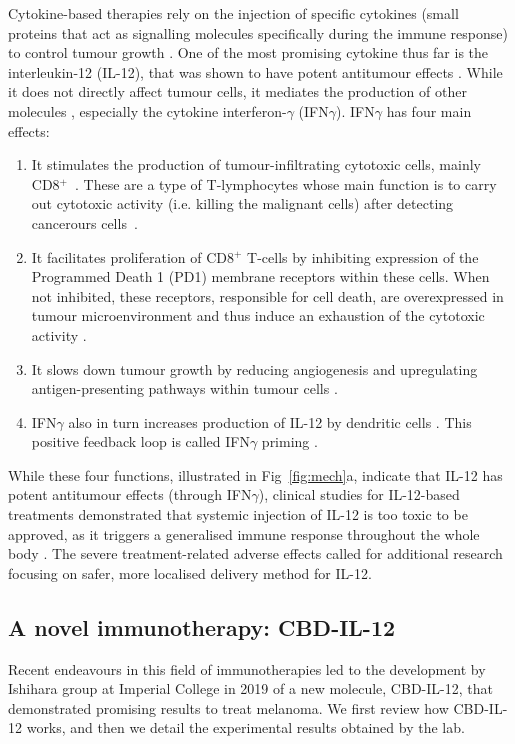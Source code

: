 \documentclass[11pt]{article}
\begin{document}
Cytokine-based therapies rely on the injection of specific cytokines (small proteins that act as signalling molecules specifically during the immune response) to control tumour growth \cite{ioDef}. One of the most promising cytokine thus far is the interleukin-12 (IL-12), that was shown to have potent antitumour effects \cite{il12IsCool}. While it does not directly affect tumour cells, it mediates the production of other molecules \cite{il12CytokineStorm}, especially the cytokine interferon-$\gamma$ (IFN$\gamma$). IFN$\gamma$ has four main effects:
\begin{enumerate}
    \item It stimulates the production of tumour-infiltrating cytotoxic cells, mainly CD8$^+$~\cite{ifngNKProd}\cite{ifnCD8}. These are a type of T-lymphocytes whose main function is to carry out cytotoxic activity (i.e. killing the malignant cells) after detecting cancerours cells~\cite{cd8Effects}.     
    \item It facilitates proliferation of CD8$^+$ T-cells by inhibiting expression of the Programmed Death 1 (PD1) membrane receptors within these cells. When not inhibited, these receptors, responsible for cell death, are overexpressed in tumour microenvironment and thus induce an exhaustion of the cytotoxic activity \cite{exhaustionPD1}.  
    \item It slows down tumour growth by reducing angiogenesis \cite{ifngAngiogenesis} and upregulating antigen-presenting pathways within tumour cells \cite{ifngAntigenExposure}.
    \item IFN$\gamma$ also in turn increases production of IL-12 by dendritic cells \cite{wang}. This positive feedback loop is called IFN$\gamma$ priming \cite{liuifng}\cite{ma2015}.
\end{enumerate}
While these four functions, illustrated in Fig~\ref{fig:mech}a, indicate that IL-12 has potent antitumour effects (through IFN$\gamma$), clinical studies for IL-12-based treatments demonstrated that systemic injection of IL-12 is too toxic to be approved, as it triggers a generalised immune response throughout the whole body \cite{clintriAC1}\cite{clintriAC3}. The severe treatment-related adverse effects called for additional research focusing on safer, more localised delivery method for IL-12.

\subsection{A novel immunotherapy: CBD-IL-12}\label{ssec:cbd}
Recent endeavours in this field of immunotherapies led to the development by Ishihara group at Imperial College in 2019 \cite{cbdil12} of a new molecule, CBD-IL-12, that demonstrated promising results to treat melanoma. We first review how CBD-IL-12 works, and then we detail the experimental results obtained by the lab. 
\end{document}
